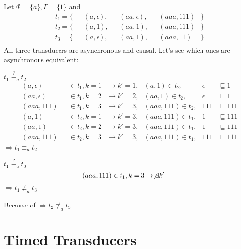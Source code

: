 \begin{exmp}[name = Asynchronous equivalence of Transducers]
  Let \(\Phi = \{a\}, \Gamma = \{1\}\) and \\
  \begin{align*}
    &t_1 = \{&&(a,\epsilon),  &&(aa,\epsilon),  &&(aaa,111)   &\} \\
    &t_2 = \{&&(a,1),         &&(aa,1),         &&(aaa,111)   &\} \\
    &t_3 = \{&&(a,\epsilon),  &&(aa,1),         &&(aaa,11)    &\}\\
  \end{align*}
  All three transducers are asynchronous and causal.
  Let's see which ones are asynchronous equivalent:

  \(t_1 \stackrel{?}{\equiv}_a t_2\)
  \begin{align*}
    &(a,\epsilon)  &&\in t_1, k = 1 &\rightarrow k' = 1, &(a,1)     \in t_2, &\epsilon  &\sqsubseteq 1 \\
    &(aa,\epsilon) &&\in t_1, k = 2 &\rightarrow k' = 2, &(aa,1)    \in t_2, &\epsilon  &\sqsubseteq 1 \\
    &(aaa,111)     &&\in t_1, k = 3 &\rightarrow k' = 3, &(aaa,111) \in t_2, &111       &\sqsubseteq 111 \\
    &(a,1)         &&\in t_2, k = 1 &\rightarrow k' = 3, &(aaa,111) \in t_1, &1         &\sqsubseteq 111 \\
    &(aa,1)        &&\in t_2, k = 2 &\rightarrow k' = 3, &(aaa,111) \in t_1, &1         &\sqsubseteq 111 \\
    &(aaa,111)     &&\in t_2, k = 3 &\rightarrow k' = 3, &(aaa,111) \in t_1, &111       &\sqsubseteq 111 \\
  \end{align*}
  \(\Rightarrow t_1 \equiv_a t_2\)

  \(t_1 \stackrel{?}{\equiv}_a t_3\)
  \begin{align*}
    &(aaa,111)     \in t_1, k = 3 \rightarrow \not\exists k'
  \end{align*}
  \(\Rightarrow t_1 \not\equiv_a t_3\)

  Because of  \(\Rightarrow t_2 \not\equiv_a t_3\).

\end{exmp}

\section{Timed Transducers}
\label{sec:definitions:timed_transducer}

